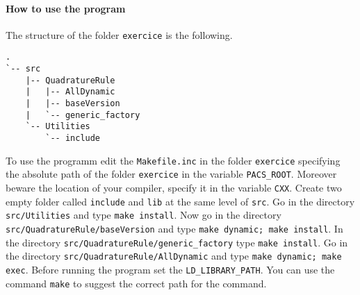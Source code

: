 \paragraph*{How to use the program}
The structure of the folder \texttt{exercice} is the following.
\begin{verbatim}
.
`-- src
    |-- QuadratureRule
    |   |-- AllDynamic
    |   |-- baseVersion
    |   `-- generic_factory
    `-- Utilities
        `-- include
\end{verbatim}
To use the programm edit the \texttt{Makefile.inc} in the folder
\texttt{exercice} specifying the absolute path of the folder \texttt{exercice}
in the variable \texttt{PACS\_ROOT}. Moreover beware the location of your
compiler, specify it in the variable \texttt{CXX}. Create two empty folder
called \texttt{include} and \texttt{lib} at the same level of \texttt{src}. Go
in the directory \texttt{src/Utilities} and type \texttt{make install}. Now go
in the directory \texttt{src/QuadratureRule/baseVersion} and type \texttt{make
dynamic; make install}. In the directory
\texttt{src/QuadratureRule/generic\_factory} type \texttt{make install}. Go in
the directory \texttt{src/QuadratureRule/AllDynamic} and type \texttt{make
dynamic; make exec}. Before running the program set the
\texttt{LD\_LIBRARY\_PATH}. You can use the command \texttt{make} to suggest the
correct path for the command.
